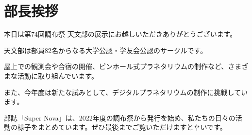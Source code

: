\documentclass[../super_nova_20yy]{subfiles}
\begin{document}
\chapter{部長挨拶}
\vspace{5\zw}
\begin{center}

	\phantom{a}\par

	本日は第74回調布祭 天文部の展示にお越しいただきありがとうございます。

	\phantom{a}\par

	天文部は部員82名からなる大学公認・学友会公認のサークルです。

	\phantom{a}\par
	屋上での観測会や合宿の開催、ピンホール式プラネタリウムの制作など、さまざまな活動に取り組んでいます。

	\phantom{a}\par
	また、今年度は新たな試みとして、デジタルプラネタリウムの制作に挑戦しています。

	\phantom{a}\par

	部誌「{\jMplus Super Nova}」は、2022年度の調布祭から発行を始め、私たちの日々の活動の様子をまとめています。ぜひ最後までご覧いただけますと幸いです。

\end{center}
\vspace{5\zw}
\end{document}

